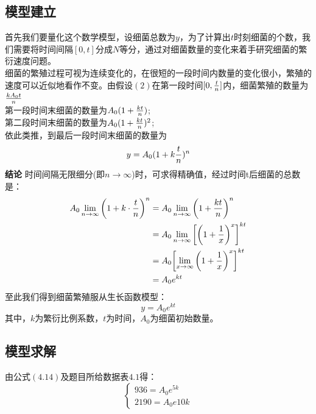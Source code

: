 \documentclass[openany]{progbookcn}
\begin{document}
\subsection{模型建立}
\indent 首先我们要量化这个数学模型，设细菌总数为$y$，为了计算出$t$时刻细菌的个数，我们需要将时间间隔$[0,t]$分成$N$等分，通过对细菌数量的变化来着手研究细菌的繁衍速度问题。\\
\indent 细菌的繁殖过程可视为连续变化的，在很短的一段时间内数量的变化很小，繁殖的速度可以近似地看作不变。由假设$(2)$在第一段时间$[0,{t\over n}]$内，细菌繁殖的数量为${kA_0t}\over n$\\
\indent 第一段时间末细菌的数量为$A_0(1+{{kt}\over n})$;\\
\indent 第二段时间末细菌的数量为$A_0(1+{{kt}\over n})^2$;\\
\indent 依此类推，到最后一段时间末细菌的数量为
\begin{equation}
y=A_0(1+k{t\over n})^n
\end{equation}
\noindent\textbf{结论}
\indent 时间间隔无限细分(即$n\to\infty$)时，可求得精确值，经过时间t后细菌的总数是：
\begin{equation}
\begin{split}
A_0\mathop {\lim }\limits_{n \to \infty } {\left( {1 +{k \cdot {t\over {n}}}} \right)^n}&= A_0 \mathop {\lim }\limits_{n \to \infty } {\left( {1 + {{kt}\over n}} \right)^n}\\
&= A_0\mathop {\lim }\limits_{n \to \infty } {\left[ {{{\left( {1 + \frac{1}{x}} \right)}^x}} \right]^{kt}}\\
&={A_0}{\left[ {\mathop {\lim }\limits_{x \to \infty } {{\left( {1 + \frac{1}{x}} \right)}^x}} \right]^{kt}}\\
&={A_0}{e^{kt}}
\end{split}
\end{equation}
\indent 至此我们得到细菌繁殖服从生长函数模型：
\begin{equation}
y=A_0e^{kt}
\end{equation}
\indent 其中，$k$为繁衍比例系数，$t$为时间，$A_0$为细菌初始数量。
\subsection{模型求解}
\indent 由公式$(4.14)$及题目所给数据表$4.1$得：
\begin{equation}
\begin{cases}
936=A_0e^{5k}\\
2190=A_0e{10k}
\end{cases}
\end{equation}
\end{document}
